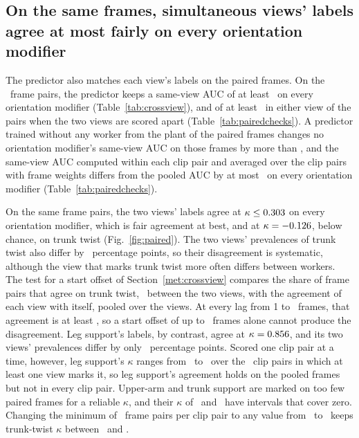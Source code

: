 \documentclass[review,3p,authoryear]{elsarticle}
\begin{document}
\subsection{On the same frames, simultaneous views' labels agree at most fairly on every orientation modifier}
\label{sec:crossview}

The predictor also matches each view's labels on the paired frames. On the
\nXviewFrames\ frame pairs, the predictor keeps a same-view AUC of at least
\pairOrientMinAuc\ on every orientation modifier (Table~\ref{tab:crossview}), and of at
least \pairOrientMinAucView\ in either view of the pairs when the two views are scored
apart (Table~\ref{tab:pairedchecks}). A predictor trained
without any worker from the plant of the paired frames changes no orientation modifier's
same-view AUC on those frames by more than \plantPairMaxDiff, and the same-view AUC computed within each clip pair and averaged over
the clip pairs with frame weights differs from the pooled AUC by at most
\withinPairMaxDiff\ on every orientation modifier (Table~\ref{tab:pairedchecks}).

On the same frame pairs, the two views' labels agree at $\kappa\le0.303$ on
every orientation modifier, which is fair agreement at best, and at $\kappa=-0.126$, below chance, on
trunk twist (Fig.~\ref{fig:paired}). The two views' prevalences of trunk twist also differ by \prevGapXviewTrunkTwist\
percentage points, so their disagreement is systematic, although the view that marks trunk
twist more often differs between workers. The test for a start offset of
Section~\ref{met:crossview} compares the share of frame pairs that agree on trunk twist,
\agreeXviewTrunkTwist\ between the two views, with the agreement of each view with itself, pooled over the views. At every lag from 1 to \xviewLagMax\ frames, that agreement is at least
\withinViewFloorTrunkTwist, so a start offset of up to \xviewLagMax\ frames alone cannot
produce the disagreement. Leg support's labels, by contrast, agree at $\kappa=0.856$,
and its two views' prevalences differ by only \prevGapXviewLegsSupport\ percentage points.
Scored one clip pair at a time, however, leg support's $\kappa$ ranges from
\xviewSessLegsMin\ to \xviewSessLegsMax\ over the \xviewSessLegsN\ clip pairs in which at
least one view marks it, so leg support's agreement holds on the pooled frames but not in
every clip pair. Upper-arm and trunk support are marked on too few paired frames for a
reliable $\kappa$, and their $\kappa$ of \kappaXviewUpperarmSupport\ and
\kappaXviewTrunkSupport\ have intervals that cover zero. Changing the minimum of
\xviewMinPairedFrames\ frame pairs per clip pair to any value from \xviewSensGridLo\ to
\xviewSensGridHi\ keeps trunk-twist $\kappa$ between \xviewSensLo\ and \xviewSensHi.
\end{document}
